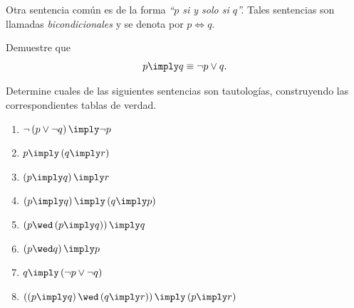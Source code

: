  Otra sentencia común es de la forma \emph{``$p$ si y solo si $q$''.}  Tales sentencias son llamadas \emph{bicondicionales} y se denota por 
 $
 p \iff q.
 $ 







 \begin{problema}
  Demuestre que $$p\imply q \equiv \neg p \vee q.$$
 \end{problema}




 \begin{problema} Determine cuales de las siguientes sentencias son tautologías, construyendo las correspondientes tablas de verdad.
  \begin{enumerate}
   \item $\neg\left( p \vee \neg q \right) \imply \neg p$
   \item $p \imply \left( q\imply r \right)$
   \item $\left( p \imply q \right)\imply r$
   \item $\left( p\imply q \right) \imply \left( q\imply p \right)$
   \item $\left( p \wed \left( p \imply q \right) \right) \imply q$
   \item $\left( p \wed q \right) \imply p$
   \item $q \imply \left( \neg p \vee \neg q \right)$
   \item $\left( \left( p\imply q \right) \wed \left( q \imply r \right) \right) \imply \left( p \imply r \right)$
  \end{enumerate}

 \end{problema}



